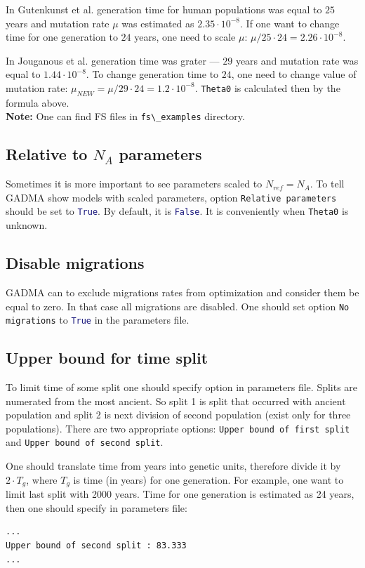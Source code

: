 \documentclass[12pt]{article}
\makeatletter
\newcommand{\py}[1]{\lstinline[language=Python, showstringspaces=False]@#1@}
\makeatother
\begin{document}
In Gutenkunst et al. \cite{gutenkunst2009} generation time for human populations was equal to $25$ years and mutation rate $\mu$ was estimated as $2.35 \cdot 10^{-8}$. If one want to change time for one generation to $24$ years, one need to scale $\mu$: $\mu / 25 \cdot 24 = 2.26 \cdot 10^{-8}$.

In Jouganous et al. \cite{Jouganous1549} generation time was grater --- $29$ years and mutation rate was equal to $1.44 \cdot 10^{-8}$. To change generation time to $24$, one need to change value of mutation rate: $\mu_{NEW} = \mu / 29 \cdot 24 = 1.2 \cdot 10^{-8}$. \py{Theta0} is calculated then by the formula above.\\

\textbf{Note: } One can find FS files in \py{fs\_examples} directory.

\subsection{Relative to $N_A$ parameters}
Sometimes it is more important to see parameters scaled to $N_{ref} = N_A$. To tell GADMA show models with scaled parameters, option \py{Relative parameters} should be set to \py{True}. By default, it is \py{False}. It is conveniently when \py{Theta0} is unknown.

\subsection{Disable migrations}
GADMA can to exclude migrations rates from optimization and consider them be equal to zero. In that case all migrations are disabled. One should set option \py{No migrations} to \py{True} in the parameters file.

\subsection{Upper bound for time split}
To limit time of some split one should specify option in parameters file. Splits are numerated from the most ancient. So split 1 is split that occurred with ancient population and split 2 is next division of second population (exist only for three populations). There are two appropriate options: \py{Upper bound of first split} and \py{Upper bound of second split}.

One should translate time from years into genetic units, therefore divide it by $2 \cdot T_g$, where $T_g$ is time (in years) for one generation. For example, one want to limit last split with 2000 years. Time for one generation is estimated as 24 years, then one should specify in parameters file:
\begin{lstlisting}
...
Upper bound of second split : 83.333
...
\end{lstlisting}
\end{document}
